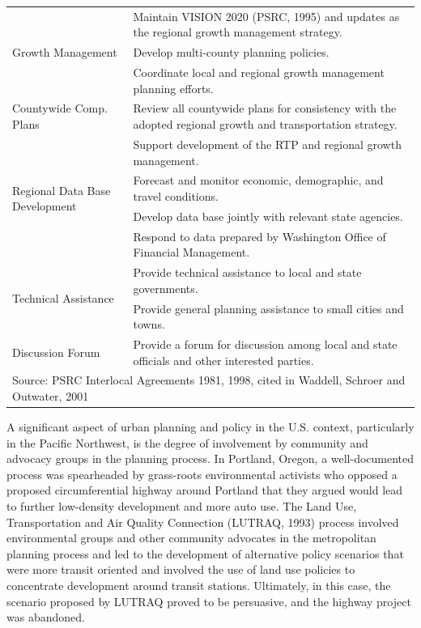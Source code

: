 \begin{table}[htp]
\begin{tabular}{ p{1.45in}  p{4.4in}  }
\midrule
\multirow{3}{1.45in}{Growth Management} & Maintain VISION 2020 (PSRC, 1995) and updates as the regional growth management strategy.\\
& Develop multi-county planning policies.\\
&   Coordinate local and regional growth management planning efforts.\\
\midrule
Countywide Comp. Plans   & Review all countywide plans for consistency with the adopted regional growth and transportation strategy.\\
\midrule
\multirow{4}{1.45in}{Regional Data Base Development}
&   Support development of the RTP and regional growth management.\\
&   Forecast and monitor economic, demographic, and travel conditions.\\
&   Develop data base jointly with relevant state agencies.\\
&   Respond to data prepared by Washington Office of Financial Management.\\
\midrule
\multirow{2}{1.45in}{Technical Assistance} &    Provide technical assistance to local and state governments.\\
&   Provide general planning assistance to small cities and towns.\\
\midrule
Discussion Forum & Provide a forum for discussion among local and state officials and other interested parties.\\
\bottomrule[1.5pt]
\multicolumn{2}{l}{Source:  PSRC Interlocal Agreements 1981, 1998, cited in Waddell, Schroer and Outwater, 2001}\\
\end{tabular}
\end{table}


A significant aspect of urban planning and policy in the U.S. context, particularly in the Pacific Northwest, is the degree of involvement by community and advocacy groups in the planning process.  In Portland, Oregon, a well-documented process was spearheaded by grass-roots environmental activists who opposed a proposed circumferential highway around Portland that they argued would lead to further low-density development and more auto use.  The Land Use, Transportation and Air Quality Connection (LUTRAQ, 1993) process involved environmental groups and other community advocates in the metropolitan planning process and led to the development of alternative policy scenarios that were more transit oriented and involved the use of land use policies to concentrate development around transit stations.  Ultimately, in this case, the scenario proposed by LUTRAQ proved to be persuasive, and the highway project was abandoned.

